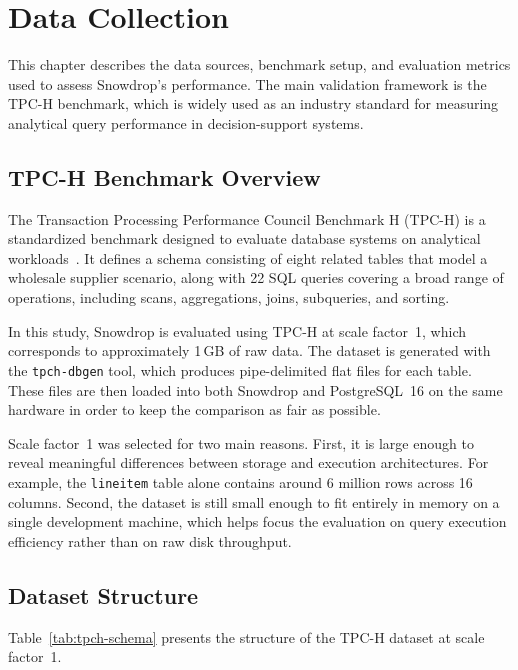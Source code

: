 %
%
\chapter{Data Collection}
\label{chap:data-collection}
\setlength{\parskip}{1em}

This chapter describes the data sources, benchmark setup, and evaluation metrics used to assess Snowdrop’s performance. The main validation framework is the TPC-H benchmark, which is widely used as an industry standard for measuring analytical query performance in decision-support systems.

\section{TPC-H Benchmark Overview}

The Transaction Processing Performance Council Benchmark H (TPC-H) is a standardized benchmark designed to evaluate database systems on analytical workloads~\cite{tpch2024}. It defines a schema consisting of eight related tables that model a wholesale supplier scenario, along with 22 SQL queries covering a broad range of operations, including scans, aggregations, joins, subqueries, and sorting.

In this study, Snowdrop is evaluated using TPC-H at scale factor~1, which corresponds to approximately 1\,GB of raw data. The dataset is generated with the \texttt{tpch-dbgen} tool, which produces pipe-delimited flat files for each table. These files are then loaded into both Snowdrop and PostgreSQL~16 on the same hardware in order to keep the comparison as fair as possible.

Scale factor~1 was selected for two main reasons. First, it is large enough to reveal meaningful differences between storage and execution architectures. For example, the \texttt{lineitem} table alone contains around 6 million rows across 16 columns. Second, the dataset is still small enough to fit entirely in memory on a single development machine, which helps focus the evaluation on query execution efficiency rather than on raw disk throughput.

\section{Dataset Structure}

Table~\ref{tab:tpch-schema} presents the structure of the TPC-H dataset at scale factor~1.

